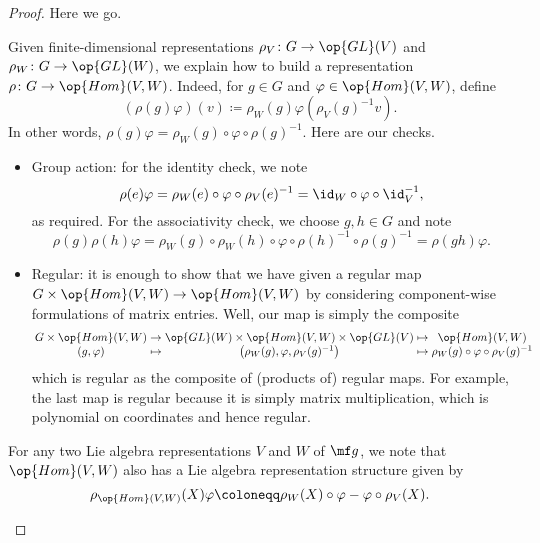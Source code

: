 \documentclass[../notes.tex]{subfiles}
\begin{document}
\begin{proof}
	Here we go.
	\begin{listalph}
		\item Given finite-dimensional representations $\rho_V\colon G\to\op{GL}(V)$ and $\rho_W\colon G\to\op{GL}(W)$, we explain how to build a representation $\rho\colon G\to\op{Hom}(V,W)$. Indeed, for $g\in G$ and $\varphi\in\op{Hom}(V,W)$, define
		\[(\rho(g)\varphi)(v)\coloneqq\rho_W(g)\varphi\left(\rho_V(g)^{-1}v\right).\]
		In other words, $\rho(g)\varphi=\rho_W(g)\circ\varphi\circ\rho(g)^{-1}$. Here are our checks.
		\begin{itemize}
			\item Group action: for the identity check, we note
			\[\rho(e)\varphi=\rho_W(e)\circ\varphi\circ\rho_V(e)^{-1}={\id_W}\circ\varphi\circ{\id_V^{-1}},\]
			as required. For the associativity check, we choose $g,h\in G$ and note
			\[\rho(g)\rho(h)\varphi=\rho_W(g)\circ\rho_W(h)\circ\varphi\circ\rho(h)^{-1}\circ\rho(g)^{-1}=\rho(gh)\varphi.\]

			\item Regular: it is enough to show that we have given a regular map $G\times\op{Hom}(V,W)\to\op{Hom}(V,W)$ by considering component-wise formulations of matrix entries. Well, our map is simply the composite
			\[\arraycolsep=1.4pt\begin{array}{cccccccc}
				G\times\op{Hom}(V,W) &\to& \op{GL}(W)\times\op{Hom}(V,W)\times\op{GL}(V) &\mapsto& \op{Hom}(V,W) \\
				(g,\varphi) &\mapsto& \left(\rho_W(g),\varphi,\rho_V(g)^{-1}\right) &\mapsto& \rho_W(g)\circ\varphi\circ\rho_V(g)^{-1}
			\end{array}\]
			which is regular as the composite of (products of) regular maps. For example, the last map is regular because it is simply matrix multiplication, which is polynomial on coordinates and hence regular.
		\end{itemize}

		\item For any two Lie algebra representations $V$ and $W$ of $\mf g$, we note that $\op{Hom}(V,W)$ also has a Lie algebra representation structure given by
		\[\rho_{\op{Hom}(V,W)}(X)\varphi\coloneqq\rho_W(X)\circ\varphi-\varphi\circ\rho_V(X).\]


\end{listalph}
\end{proof}
\end{document}
